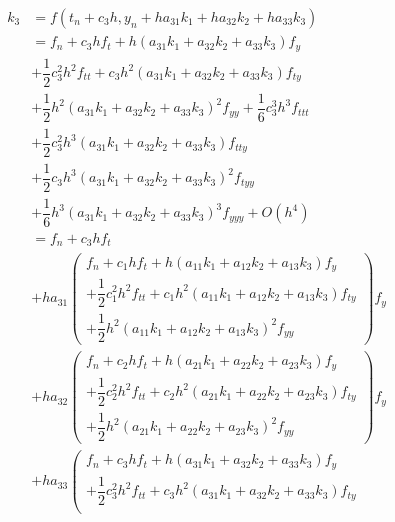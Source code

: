 \documentclass[a4paper,oneside]{book}
\numberwithin{equation}{chapter}
\begin{document}
\begin{align}
{k_3} &= f\left( {{t_n} + {c_3}h,{y_n} + h{a_{31}}{k_1} + h{a_{32}}{k_2} + h{a_{33}}{k_3}} \right)\\
 &= {f_n} + {c_3}h{f_t} + h\left( {{a_{31}}{k_1} + {a_{32}}{k_2} + {a_{33}}{k_3}} \right){f_y}\\
& + \dfrac{1}{2}c_3^2{h^2}{f_{tt}} + {c_3}{h^2}\left( {{a_{31}}{k_1} + {a_{32}}{k_2} + {a_{33}}{k_3}} \right){f_{ty}}\\
 &+ \dfrac{1}{2}{h^2}{\left( {{a_{31}}{k_1} + {a_{32}}{k_2} + {a_{33}}{k_3}} \right)^2}{f_{yy}} + \dfrac{1}{6}c_3^3{h^3}{f_{ttt}}\\
& + \dfrac{1}{2}c_3^2{h^3}\left( {{a_{31}}{k_1} + {a_{32}}{k_2} + {a_{33}}{k_3}} \right){f_{tty}}\\
& + \dfrac{1}{2}{c_3}{h^3}{\left( {{a_{31}}{k_1} + {a_{32}}{k_2} + {a_{33}}{k_3}} \right)^2}{f_{tyy}}\\
& + \dfrac{1}{6}{h^3}{\left( {{a_{31}}{k_1} + {a_{32}}{k_2} + {a_{33}}{k_3}} \right)^3}{f_{yyy}} + O\left( {{h^4}} \right)\\
 &= {f_n} + {c_3}h{f_t}\\
& + h{a_{31}}\left( \begin{array}{l}
{f_n} + {c_1}h{f_t} + h\left( {{a_{11}}{k_1} + {a_{12}}{k_2} + {a_{13}}{k_3}} \right){f_y}\\
 + \dfrac{1}{2}c_1^2{h^2}{f_{tt}} + {c_1}{h^2}\left( {{a_{11}}{k_1} + {a_{12}}{k_2} + {a_{13}}{k_3}} \right){f_{ty}}\\
 + \dfrac{1}{2}{h^2}{\left( {{a_{11}}{k_1} + {a_{12}}{k_2} + {a_{13}}{k_3}} \right)^2}{f_{yy}}
\end{array} \right){f_y}\\
& + h{a_{32}}\left( \begin{array}{l}
{f_n} + {c_2}h{f_t} + h\left( {{a_{21}}{k_1} + {a_{22}}{k_2} + {a_{23}}{k_3}} \right){f_y}\\
 + \dfrac{1}{2}c_2^2{h^2}{f_{tt}} + {c_2}{h^2}\left( {{a_{21}}{k_1} + {a_{22}}{k_2} + {a_{23}}{k_3}} \right){f_{ty}}\\
 + \dfrac{1}{2}{h^2}{\left( {{a_{21}}{k_1} + {a_{22}}{k_2} + {a_{23}}{k_3}} \right)^2}{f_{yy}}
\end{array} \right){f_y}\\
& + h{a_{33}}\left( \begin{array}{l}
{f_n} + {c_3}h{f_t} + h\left( {{a_{31}}{k_1} + {a_{32}}{k_2} + {a_{33}}{k_3}} \right){f_y}\\
 + \dfrac{1}{2}c_3^2{h^2}{f_{tt}} + {c_3}{h^2}\left( {{a_{31}}{k_1} + {a_{32}}{k_2} + {a_{33}}{k_3}} \right){f_{ty}}\\

\end{array}
\end{align}
\end{document}

